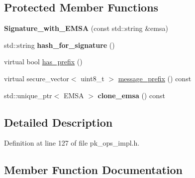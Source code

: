 \subsection*{Protected Member Functions}
\begin{DoxyCompactItemize}
\item 
\mbox{\label{class_botan_1_1_p_k___ops_1_1_signature__with___e_m_s_a_a8a66af1fef8b60c0f3be2d01e08ad29c}} 
{\bfseries Signature\+\_\+with\+\_\+\+E\+M\+SA} (const std\+::string \&emsa)
\item 
\mbox{\label{class_botan_1_1_p_k___ops_1_1_signature__with___e_m_s_a_a1131ccff5a619a48aa8ac18663af1aea}} 
std\+::string {\bfseries hash\+\_\+for\+\_\+signature} ()
\item 
virtual bool \mbox{\hyperlink{class_botan_1_1_p_k___ops_1_1_signature__with___e_m_s_a_ab4da61a06cf9709d9f240b445142481b}{has\+\_\+prefix}} ()
\item 
virtual secure\+\_\+vector$<$ uint8\+\_\+t $>$ \mbox{\hyperlink{class_botan_1_1_p_k___ops_1_1_signature__with___e_m_s_a_a244a2198ae06eee87af2e273d8ca8882}{message\+\_\+prefix}} () const
\item 
\mbox{\label{class_botan_1_1_p_k___ops_1_1_signature__with___e_m_s_a_aae1a4b0e9c0e312c8f9e2e1d63f40d27}} 
std\+::unique\+\_\+ptr$<$ E\+M\+SA $>$ {\bfseries clone\+\_\+emsa} () const
\end{DoxyCompactItemize}


\subsection{Detailed Description}


Definition at line 127 of file pk\+\_\+ops\+\_\+impl.\+h.



\subsection{Member Function Documentation}
\mbox{\label{class_botan_1_1_p_k___ops_1_1_signature__with___e_m_s_a_ab4da61a06cf9709d9f240b445142481b}} 
